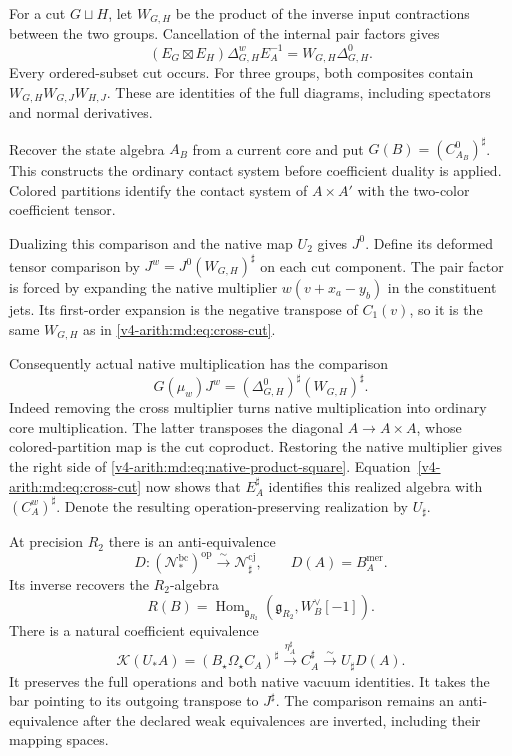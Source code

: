 For a cut $G\sqcup H$, let $W_{G,H}$ be the product
of the inverse input contractions between the two
groups. Cancellation of the internal pair factors
gives
\begin{equation}\label{v4-arith:md:eq:cross-cut}
 (E_G\boxtimes E_H)\Delta^w_{G,H}E_A^{-1}
 =W_{G,H}\Delta^0_{G,H}.
\end{equation}
Every ordered-subset cut occurs. For three groups,
both composites contain $W_{G,H}W_{G,J}W_{H,J}$.
These are identities of the full diagrams, including
spectators and normal derivatives.

Recover the state algebra $A_B$ from a current core
and put $G(B)=(C_{A_B}^0)^\sharp$.
This constructs the ordinary contact system before
coefficient duality is applied.
Colored partitions identify the contact system of
$A\times A'$ with the two-color coefficient tensor.

Dualizing this comparison and the native map $U_2$
gives $J^0$. Define its deformed tensor comparison by
$J^w=J^0(W_{G,H})^\sharp$ on each cut component.
The pair factor is forced by expanding the native
multiplier $w(v+x_a-y_b)$ in the constituent jets.
Its first-order expansion is the negative transpose
of $C_1(v)$, so it is the same $W_{G,H}$ as in
\eqref{v4-arith:md:eq:cross-cut}.

Consequently actual native multiplication has the
comparison
\begin{equation}\label{v4-arith:md:eq:native-product-square}
 G(\mu_w)J^w
 = (\Delta^0_{G,H})^\sharp(W_{G,H})^\sharp.
\end{equation}
Indeed removing the cross multiplier turns native
multiplication into ordinary core multiplication.
The latter transposes the diagonal $A\to A\times A$,
whose colored-partition map is the cut coproduct.
Restoring the native multiplier gives the right
side of \eqref{v4-arith:md:eq:native-product-square}.
Equation~\eqref{v4-arith:md:eq:cross-cut} now shows that
$E_A^\sharp$ identifies this realized algebra with
$(C_A^w)^\sharp$. Denote the resulting operation-preserving
realization by $U_\sharp$.

\begin{theorem}
\label{v4-arith:md:thm:native}
At precision $R_2$ there is an anti-equivalence
\[
 D:(\mathcal N_*^{\mathrm{bc}})^{\mathrm{op}}
 \xrightarrow{\sim}\mathcal N_\sharp^{\mathrm{cj}},
 \qquad D(A)=B_A^{\mathrm{mer}}.
\]
Its inverse recovers the $R_2$-algebra
\[
 R(B)=\operatorname{Hom}_{\mathfrak g_{R_2}}
       (\mathfrak g_{R_2},W_B^\vee[-1]).
\]
There is a natural coefficient equivalence
\begin{equation}\label{v4-arith:md:eq:native-square}
 \mathcal K(U_*A)
 =(B_\star\Omega_\star C_A)^\sharp
 \xrightarrow{\eta_A^\sharp}C_A^\sharp
 \xrightarrow{\sim}U_\sharp D(A).
\end{equation}
It preserves the full operations and both native
vacuum identities. It takes the bar pointing to
its outgoing transpose to $J^\sharp$.
The comparison remains an anti-equivalence after
the declared weak equivalences are inverted,
including their mapping spaces.
\end{theorem}

